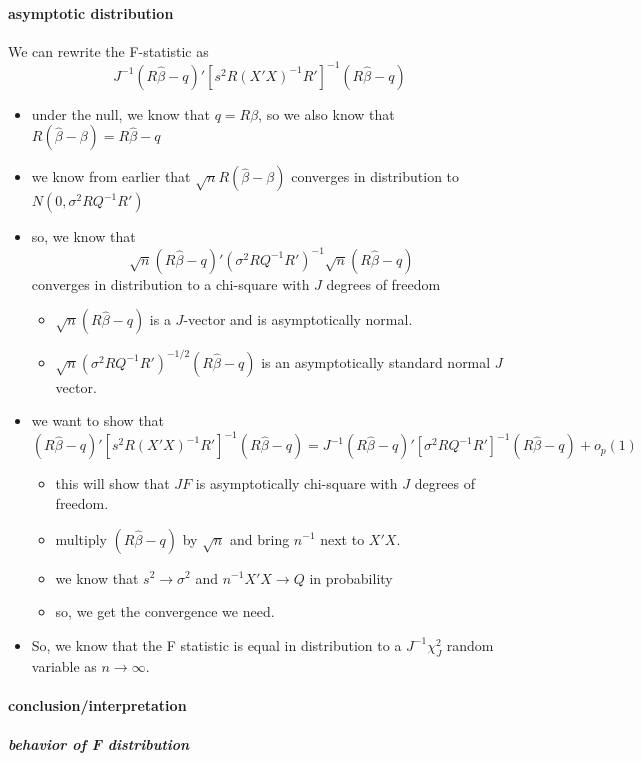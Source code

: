 \documentclass[11pt]{article}
\begin{document}
\paragraph{asymptotic distribution}
\label{sec-3-1-2-2}

       We can rewrite the F-statistic as
       \[ J^{-1} (R\hat\beta - q)'[s^2 R(X'X)^{-1}R']^{-1}(R\hat\beta -
       q) \]
\begin{itemize}
\item under the null, we know that $q = R\beta$, so we also know
         that $R(\hat\beta - \beta) = R\hat\beta - q$
\item we know from earlier that $\sqrt{n} R(\hat\beta - \beta)$
         converges in distribution to $N(0, \sigma^2 R Q^{-1} R')$
\item so, we know that \[\sqrt{n} (R\hat\beta - q)' (\sigma^2 R
         Q^{-1} R')^{-1} \sqrt{n} (R\hat\beta - q) \] converges in
         distribution to a chi-square with $J$ degrees of freedom
\begin{itemize}
\item $\sqrt{n}(R\hat\beta - q)$ is a $J$-vector and is asymptotically
           normal.
\item $\sqrt{n}(\sigma^2 R Q^{-1} R')^{-1/2} (R\hat\beta - q)$ is
           an asymptotically standard normal $J$ vector.
\end{itemize}
\item we want to show that \[ (R\hat\beta - q)'[s^2
         R(X'X)^{-1}R']^{-1}(R\hat\beta - q) = J^{-1} (R\hat\beta -
         q)'[\sigma^2 RQ^{-1}R']^{-1}(R\hat\beta - q) + o_p(1)\]
\begin{itemize}
\item this will show that $J F$ is asymptotically chi-square with
           $J$ degrees of freedom.
\item multiply $(R\hat\beta - q)$ by $\sqrt{n}$ and bring $n^{-1}$
           next to $X'X$.
\item we know that $s^2 \to \sigma^2$ and $n^{-1} X'X \to Q$ in probability
\item so, we get the convergence we need.
\end{itemize}
\item So, we know that the F statistic is equal in distribution
         to a $J^{-1} \chi_J^2$ random variable as $n \to \infty$.
\end{itemize}
\paragraph{conclusion/interpretation}
\label{sec-3-1-2-3}
\subparagraph{behavior of F distribution}
\label{sec-3-1-2-3-1}
\end{document}
